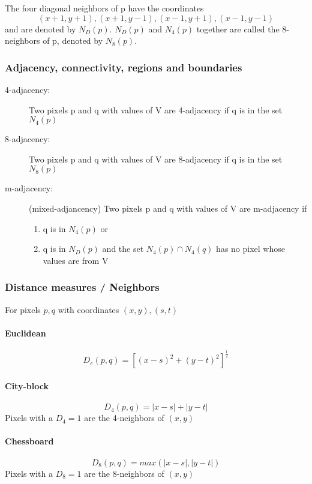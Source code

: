 The four diagonal neighbors of p have the coordinates
\[
	(x+1, y+1), (x+1, y-1), (x-1, y+1), (x-1, y-1)
\]
and are denoted by $N_D(p)$. $N_D(p)$ and $N_4(p)$ together are called the 8-neighbors of p, denoted by $N_8(p)$.


\subsubsection{Adjacency, connectivity, regions and boundaries}
\begin{description}
  \item[4-adjacency:] Two pixels p and q with values of V are 4-adjacency if q is in the set $N_4(p)$
  \item[8-adjacency:] Two pixels p and q with values of V are 8-adjacency if q is in the set $N_8(p)$
  \item[m-adjacency:] (mixed-adjancency) Two pixels p and q with values of V are m-adjacency if
  	\begin{enumerate}
  		\item q is in $N_4(p)$ or
  		\item q is in $N_D(p)$ and the set $N_4(p) \cap N_4(q)$ has no pixel whose values are from V 
	\end{enumerate}
\end{description}

\subsubsection{Distance measures / Neighbors }
For pixels $p,q$  with coordinates $(x,y), (s,t)$
\paragraph{Euclidean}
\begin{equation}
D_e(p,q) = [(x-s)^2 + (y-t)^2]^{\frac{1}{2}}
\end{equation}
\paragraph{City-block}
\begin{equation}
D_4(p,q) = |x-s| + |y-t|
\end{equation}
Pixels with a $D_4 = 1$ are the 4-neighbors of $(x,y)$
\paragraph{Chessboard}
\begin{equation}
D_8(p,q) = max(|x-s|, |y-t|)
\end{equation}
Pixels with a $D_8 = 1$ are the 8-neighbors of $(x,y)$

